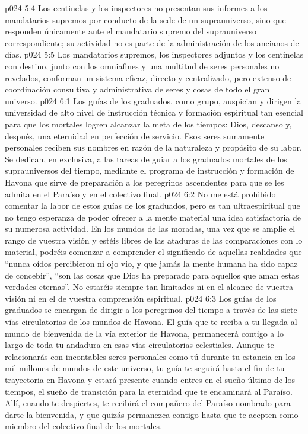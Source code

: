\vs p024 5:4 Los centinelas y los inspectores no presentan sus informes a los mandatarios supremos por conducto de la sede de un suprauniverso, sino que responden únicamente ante el mandatario supremo del suprauniverso correspondiente; su actividad no es parte de la administración de los ancianos de días.
\vs p024 5:5 \pc Los mandatarios supremos, los inspectores adjuntos y los centinelas con destino, junto con los omniafines y una multitud de seres personales no revelados, conforman un sistema eficaz, directo y centralizado, pero extenso de coordinación consultiva y administrativa de seres y cosas de todo el gran universo.
\vs p024 6:1 Los guías de los graduados, como grupo, auspician y dirigen la universidad de alto nivel de instrucción técnica y formación espiritual tan esencial para que los mortales logren alcanzar la meta de los tiempos: Dios, descanso y, después, una eternidad en perfección de servicio. Esos seres sumamente personales reciben sus nombres en razón de la naturaleza y propósito de su labor. Se dedican, en exclusiva, a las tareas de guiar a los graduados mortales de los suprauniversos del tiempo, mediante el programa de instrucción y formación de Havona que sirve de preparación a los peregrinos ascendentes para que se les admita en el Paraíso y en el colectivo final.
\vs p024 6:2 No me está prohibido comentar la labor de estos guías de los graduados, pero es tan ultraespiritual que no tengo esperanza de poder ofrecer a la mente material una idea satisfactoria de su numerosa actividad. En los mundos de las moradas, una vez que se amplíe el rango de vuestra visión y estéis libres de las ataduras de las comparaciones con lo material, podréis comenzar a comprender el significado de aquellas realidades que “nunca oídos percibieron ni ojo vio, y que jamás la mente humana ha sido capaz de concebir”, “son las cosas que Dios ha preparado para aquellos que aman estas verdades eternas”. No estaréis siempre tan limitados ni en el alcance de vuestra visión ni en el de vuestra comprensión espiritual.
\vs p024 6:3 Los guías de los graduados se encargan de dirigir a los peregrinos del tiempo a través de las siete vías circulatorias de los mundos de Havona. El guía que te reciba a tu llegada al mundo de bienvenida de la vía exterior de Havona, permanecerá contigo a lo largo de toda tu andadura en esas vías circulatorias celestiales. Aunque te relacionarás con incontables seres personales como tú durante tu estancia en los mil millones de mundos de este universo, tu guía te seguirá hasta el fin de tu trayectoria en Havona y estará presente cuando entres en el sueño último de los tiempos, el sueño de transición para la eternidad que te encaminará al Paraíso. Allí, cuando te despiertes, te recibirá el compañero del Paraíso nombrado para darte la bienvenida, y que quizás permanezca contigo hasta que te acepten como miembro del colectivo final de los mortales.

